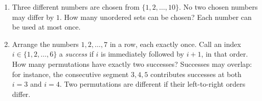 \documentclass[11pt]{article}
\begin{document}
\begin{enumerate}[label=\textbf{\arabic*.},start=7]
\item Three different numbers are chosen from $\{1,2,\ldots,10\}$.
No two chosen numbers may differ by $1$. How many unordered sets can be
chosen? Each number can be used at most once.

\item Arrange the numbers $1,2,\ldots,7$ in a row, each exactly once.
Call an index $i\in\{1,2,\ldots,6\}$ a \emph{success} if $i$ is
immediately followed by $i+1$, in that order. How many permutations
have exactly two successes? Successes may overlap: for instance,
the consecutive segment $3,4,5$ contributes successes at both $i=3$
and $i=4$. Two permutations are different if their left-to-right orders differ.
\end{enumerate}
\end{document}
